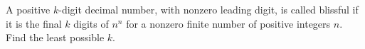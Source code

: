 A positive $k$-digit decimal number, with nonzero leading digit, is called blissful if it is the final $k$ digits of $n^n$ for a nonzero finite number of positive integers $n$. Find the least possible $k$.
